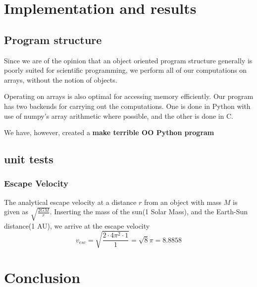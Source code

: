 \documentclass[a4paper]{article}
\begin{document}






\section{Implementation and results}\label{sec:implementation_and_results}
\subsection{Program structure}
Since we are of the opinion that an object oriented program structure generally is poorly suited for scientific programming, we perform all of our computations on arrays, without the notion of objects.

Operating on arrays is also optimal for accessing memory efficiently. Our program has two backends for carrying out the computations. One is done in Python with use of numpy's array arithmetic where possible, and the other is done in C.

We have, however, created a \textbf{make terrible OO Python program}

\subsection{unit tests}
\subsubsection{Escape Velocity}
The analytical escape velocity at a distance $r$ from an object with mass $M$ is given as $\sqrt{\frac{2GM}{r}}$. Inserting the mass of the sun(1 Solar Mass), and the Earth-Sun distance(1 AU), we arrive at the escape velocity
\begin{equation}
v_{esc} = \sqrt{\frac{2\cdot 4\pi^2 \cdot 1}{1}} = \sqrt{8}\pi = 8.8858
\end{equation}

\section{Conclusion}\label{sec:conclusion}


%
%

{}
\end{document}
